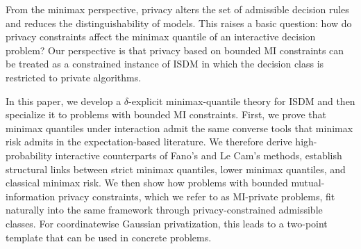 \documentclass[journal]{IEEEtran}
\begin{document}
From the minimax perspective, privacy alters the set of admissible decision rules and reduces the distinguishability of models. This raises a basic question: how do privacy constraints affect the minimax quantile of an interactive decision problem? Our perspective is that privacy based on bounded MI constraints can be treated as a constrained instance of ISDM in which the decision class is restricted to private algorithms.

In this paper, we develop a \(\delta\)-explicit minimax-quantile theory for ISDM and then specialize it to problems with bounded MI constraints. First, we prove that minimax quantiles under interaction admit the same converse tools that minimax risk admits in the expectation-based literature. We therefore derive high-probability interactive counterparts of Fano's and Le Cam's methods, establish structural links between strict minimax quantiles, lower minimax quantiles, and classical minimax risk. We then show how problems with bounded mutual-information privacy constraints, which we refer to as MI-private problems, fit naturally into the same framework through privacy-constrained admissible classes. For coordinatewise Gaussian privatization, this leads to a two-point template that can be used in concrete problems.
\end{document}
